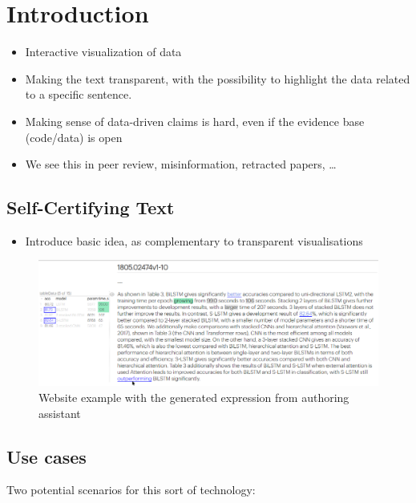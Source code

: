 \section{Introduction}

\lstset{
    aboveskip=-2.3pt,    %
    belowskip=-2pt,    %
    xleftmargin=0pt,   %
    xrightmargin=0pt   %
}

\begin{itemize}
    \item Interactive visualization of data
    \item Making the text transparent, with the possibility to highlight the data related to a specific sentence.
    \item Making sense of data-driven claims is hard, even if the evidence base (code/data) is open
    \item We see this in peer review, misinformation, retracted papers, …
\end{itemize}

\subsection{Self-Certifying Text}

\begin{itemize}
    \item Introduce basic idea, as complementary to transparent visualisations
\end{itemize}

\begin{figure}
    \centering
    \includegraphics[width=\linewidth]{fig/scigen-mr-1906.02780-10.png}
    \caption{Website example with the generated expression from authoring assistant}\label{fig:scigen-example-website}
\end{figure}


\subsection{Use cases}
Two potential scenarios for this sort of technology:

